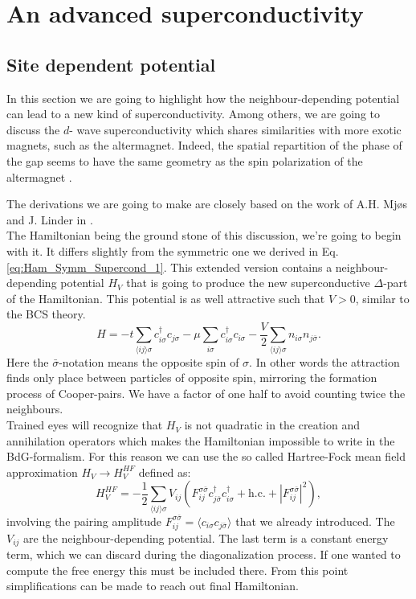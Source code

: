 \documentclass[../main.tex]{subfile}
\begin{document}
\section{An advanced superconductivity}
\subsection{Site dependent potential}
In this section we are going to highlight how the neighbour-depending potential can lead to a new kind of superconductivity. Among others, we are going to discuss the $d$-
wave superconductivity which shares similarities with more exotic magnets, such as the altermagnet. 
Indeed, the spatial repartition of the phase of the gap seems to have the same geometry as the spin polarization of the altermagnet \cite{Smejkal2022} .

The derivations we are going to make are closely based on the work of A.H. Mjøs and J. Linder in \cite{Mjos2019}.\\

The Hamiltonian being the ground stone of this 
discussion, we're going to begin with it. It differs slightly from the symmetric one we derived in Eq.\ref{eq:Ham_Symm_Supercond_1}. This extended version contains a neighbour-depending potential 
$H_V$ that is going to 
produce the new superconductive $\Delta$-part of the Hamiltonian. This potential is as well attractive such that $V>0$, similar to the BCS theory.
\begin{equation}
    H = -t\sum_{\langle ij\rangle \sigma} c_{i\sigma}^{\dagger}c_{j\sigma} - \mu \sum_{i\sigma} c_{i\sigma}^{\dagger}c_{i\sigma} - \frac{V}{2} \sum_{\langle ij\rangle \sigma} n_{i\sigma}n_{j\bar{\sigma}}.
\end{equation}
Here the $\bar{\sigma}$-notation means the opposite spin of $\sigma$. In other words the attraction finds only place between particles of opposite spin,
 mirroring the formation process of Cooper-pairs.
We have a factor of one half to avoid counting twice the neighbours.\\

Trained eyes will recognize that $H_V$ is not quadratic in the creation and annihilation operators which makes the Hamiltonian impossible to write in the BdG-formalism. For this reason we can 
use the so called Hartree-Fock mean field approximation $H_V \rightarrow H^{HF}_V$ defined as:
\begin{equation}
    H^{HF}_V = -\frac{1}{2} \sum_{\langle ij\rangle \sigma} V_{ij} \left(F_{ij}^{\sigma \bar{\sigma}} c^{\dagger}_{j\bar{\sigma}}c^{\dagger}_{i\sigma} + \text{h.c.} 
    + |F_{ij}^{\sigma \bar{\sigma}}|^2\right),
\end{equation}
involving the pairing amplitude $F_{ij}^{\sigma \bar{\sigma}} = \langle c_{i\sigma}c_{j\bar{\sigma}}\rangle$ that we already introduced. The $V_{ij}$ are the neighbour-depending potential.
The last term is a constant energy term, which we can discard during the diagonalization process. If one wanted to compute the free energy this must be included there.
From this point simplifications can be made to reach out final Hamiltonian.\\
\end{document}
